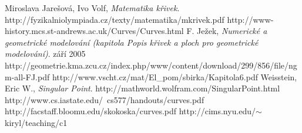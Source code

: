 \documentclass[12pt,a4paper]{report}
\begin{document}
\begin{thebibliography}{99}
	\raggedright
	Miroslava Jarešová, Ivo Volf,
	\textit{Matematika křivek}.
	http://fyzikalniolympiada.cz/texty/matematika/mkrivek.pdf
	http://www-history.mcs.st-andrews.ac.uk/Curves/Curves.html
	F. Ježek, 
	\textit{Numerické a geometrické modelování (kapitola Popis křivek a ploch pro geometrické modelování)}.
	září 2005
	http://geometrie.kma.zcu.cz/index.php/www/content/download/299/856/file/ngm-all-FJ.pdf
	http://www.vscht.cz/mat/El\_pom/sbirka/Kapitola6.pdf
	Weisstein, Eric W.,
	\textit{Singular Point}.
	http://mathworld.wolfram.com/SingularPoint.html 
	http://www.cs.iastate.edu/~cs577/handouts/curves.pdf
	http://facstaff.bloomu.edu/skokoska/curves.pdf
	http://cims.nyu.edu/$\sim$kiryl/teaching/c1
\end{thebibliography}
\end{document}
